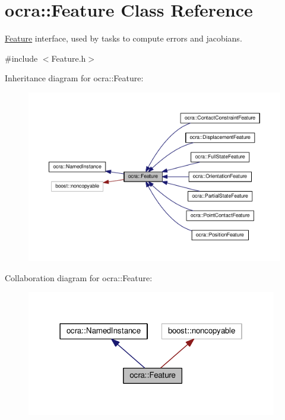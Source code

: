 \hypertarget{classocra_1_1Feature}{}\section{ocra\+:\+:Feature Class Reference}
\label{classocra_1_1Feature}


\hyperlink{classocra_1_1Feature}{Feature} interface, used by tasks to compute errors and jacobians.  




{\ttfamily \#include $<$Feature.\+h$>$}



Inheritance diagram for ocra\+:\+:Feature\+:
\nopagebreak
\begin{figure}[H]
\begin{center}
\leavevmode
\includegraphics[width=350pt]{d8/daa/classocra_1_1Feature__inherit__graph}
\end{center}
\end{figure}


Collaboration diagram for ocra\+:\+:Feature\+:
\nopagebreak
\begin{figure}[H]
\begin{center}
\leavevmode
\includegraphics[width=310pt]{df/da1/classocra_1_1Feature__coll__graph}
\end{center}
\end{figure}
